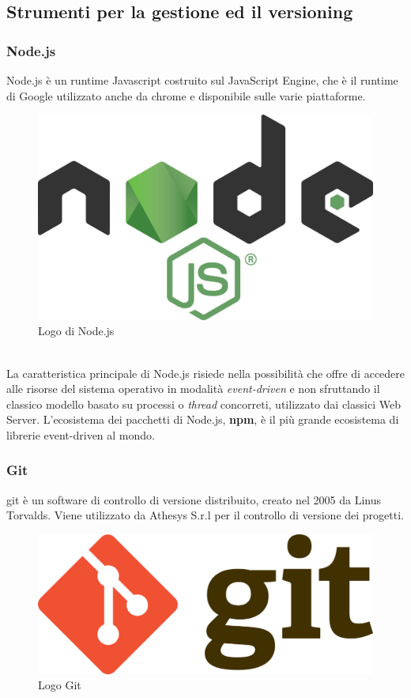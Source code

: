 \subsection{Strumenti per la gestione ed il versioning}
\subsubsection{Node.js}
Node.js è un runtime Javascript costruito sul JavaScript Engine\cite{nodeGuida}, che è il runtime di Google utilizzato anche da chrome e disponibile sulle varie piattaforme.
\begin{figure}[h]
	\centering
	\includegraphics[scale=0.05]{immagini/nodejs}
	\caption{Logo di Node.js}
\end{figure}
\\
La caratteristica principale di Node.js risiede nella possibilità che offre di accedere alle risorse del sistema operativo in modalità \emph{\gls{event-driven}}\glsfirstoccur\cite{nodeEvent} e non sfruttando il classico modello basato su processi o \textit{thread} concorreti, utilizzato dai classici Web Server. L'ecosistema dei pacchetti di Node.js, \textbf{npm}, è il più grande ecosistema di librerie \gls{event-driven} al mondo.
\subsubsection{Git}
\gls{git} è un software di controllo di versione distribuito, creato nel 2005 da Linus Torvalds\cite{gitSite}. Viene utilizzato da Athesys S.r.l per il controllo di versione dei progetti.
\begin{figure}[h]
	\centering
	\includegraphics[scale=0.05]{immagini/git}
	\caption{Logo Git}
\end{figure}


